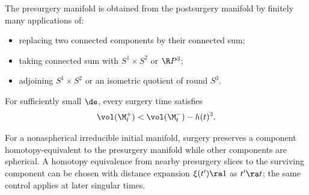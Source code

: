 \begin{lemma}
  \label{lem:kl-performing-surgery-continuing-flows-rigidity-ricci-flow-surgery}
 \label{reconstruct2}
The presurgery manifold is obtained from the postsurgery manifold by finitely
many applications of:
\begin{itemize}
\item replacing two connected components by their connected sum;
\item taking connected sum with $S^1\times S^2$ or $\R P^3$;
\item adjoining $S^1\times S^2$ or an isometric quotient of round $S^3$.
\end{itemize}
\end{lemma}

\begin{remark}
  \label{rem:kl-performing-surgery-continuing-flows-structural-remark-ricci-flow-surgery}
\label{volumelossremark}
For sufficiently small $\de$, every surgery time satisfies
\[
\vol(\M_t^+)<\vol(\M_t^-)-h(t)^3.
\]
\end{remark}

\begin{remark}
  \label{rem:kl-performing-surgery-continuing-flows-existence-ricci-flow-surgery}
For a nonaspherical irreducible initial manifold, surgery preserves a
component homotopy-equivalent to the presurgery manifold while other
components are spherical. A homotopy equivalence from nearby presurgery
slices to the surviving component can be chosen with distance expansion
$\xi(t')\ra1$ as $t'\ra t$; the same control applies at later singular times.
\end{remark}


